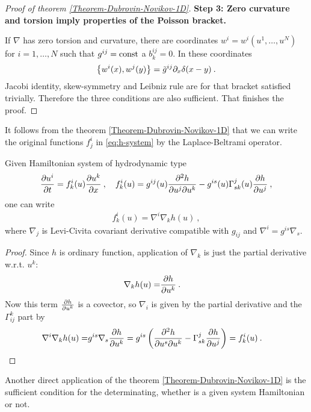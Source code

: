 \begin{proof}[Proof of theorem \ref{Theorem-Dubrovin-Novikov-1D}]
    \textbf{Step 3: Zero curvature and torsion imply properties of the Poisson bracket.}

    If $\nabla$ has zero torsion and curvature, there are coordinates $w^i=w^i(u^1,\dots,u^N)$ for $i=1,\dots,N$ such that $g^{ij} = \mathrm{const}$ a $b^{ij}_k = 0$. In these coordinates
    \begin{align}
        \left \lbrace w^i(x),w^j(y) \right \rbrace = \tilde{g}^{ij} \partial_x \delta(x-y) \:.
    \end{align}
    Jacobi identity, skew-symmetry and Leibniz rule are for that bracket satisfied trivially. Therefore the three conditions are also sufficient. That finishes the proof.
\end{proof}

It follows from the theorem \vref{Theorem-Dubrovin-Novikov-1D} that we can write the original functions $f^{i}_j$ in \eqref{eq:h-system} by the Laplace-Beltrami operator.

\begin{proposition}
    Given Hamiltonian system of hydrodynamic type
    \begin{align}
        \frac{\partial u^i}{\partial t} = f^i_k(u) \frac{\partial u^k}{\partial x} \:, \quad f^i_k(u) = g^{ij}(u) \frac{\partial^2 h}{\partial u^j \partial u^k} - g^{is}(u) \Gamma^j_{sk}(u) \frac{\partial h}{\partial u^j} \:, \label{eq:hamiltonovsky-system}
    \end{align}
    one can write
    \begin{align}
        f^i_k(u) = \nabla^i \nabla_k h(u) \:, 
    \end{align}
    where $\nabla_j$ is Levi-Civita covariant derivative compatible with $g_{ij}$ and $\nabla^i = g^{is} \nabla_s$. 
\end{proposition}
\begin{proof}
    Since $h$ is ordinary function, application of $\nabla_k$ is just the partial derivative w.r.t. $u^k$:
    \begin{align}
        \nabla_k h(u) =& \frac{\partial h}{\partial u^k} \:.
    \end{align}
    Now this term $\frac{\partial h}{\partial u^k}$ is a covector, so $\nabla_i$ is given by the partial derivative and the $\Gamma_{ij}^k$ part by
    \begin{align}
        \nabla^i \nabla_k h(u) =& g^{is} \nabla_s \frac{\partial h}{\partial u^k} = g^{is} \left( \frac{\partial^2 h}{\partial u^s \partial u^k} - \Gamma^j_{sk} \frac{\partial h}{\partial u^j} \right) = f^i_k(u) \:.
    \end{align}
\end{proof}

Another direct application of the theorem \vref{Theorem-Dubrovin-Novikov-1D} is the sufficient condition for the determinating, whether is a given system Hamiltonian or not.

